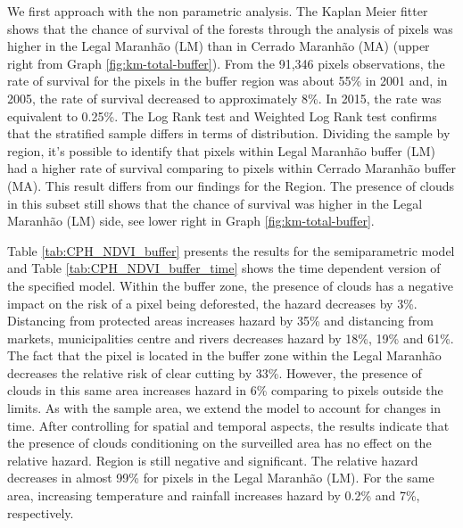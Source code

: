 We first approach with the non parametric analysis. The Kaplan Meier fitter shows that the chance of survival of the forests through the analysis of pixels was higher in the Legal Maranhão (LM) than in Cerrado Maranhão (MA) (upper right from Graph \ref{fig:km-total-buffer}). From the 91,346 pixels observations, the rate of survival for the pixels in the buffer region was about 55\% in 2001 and, in 2005, the rate of survival decreased to approximately 8\%. In 2015, the rate was equivalent to 0.25\%. The Log Rank test and Weighted Log Rank test confirms that the stratified sample differs in terms of distribution. Dividing the sample by region, it's possible to identify that pixels within Legal Maranhão buffer (LM) had a higher rate of survival comparing to pixels within Cerrado Maranhão buffer (MA). This result differs from our findings for the Region. The presence of clouds in this subset still shows that the chance of survival was higher in the Legal Maranhão (LM) side, see lower right in Graph \ref{fig:km-total-buffer}. 

Table \ref{tab:CPH_NDVI_buffer} presents the results for the semiparametric model and Table \ref{tab:CPH_NDVI_buffer_time} shows the time dependent version of the specified model. Within the buffer zone, the presence of clouds has a negative impact on the risk of a pixel being deforested, the hazard decreases by 3\%. Distancing from protected areas increases hazard by 35\% and distancing from markets, municipalities centre and rivers decreases hazard by 18\%, 19\% and 61\%. The fact that the pixel is located in the buffer zone within the Legal Maranhão decreases the relative risk of clear cutting by 33\%. However, the presence of clouds in this same area increases hazard in 6\% comparing to pixels outside the limits. As with the sample area, we extend the model to account for changes in time. After controlling for spatial and temporal aspects, the results indicate that the presence of clouds conditioning on the surveilled area has no effect on the relative hazard. Region is still negative and significant. The relative hazard decreases in almost 99\% for pixels in the Legal Maranhão (LM). For the same area, increasing temperature and rainfall increases hazard by 0.2\% and 7\%, respectively.

